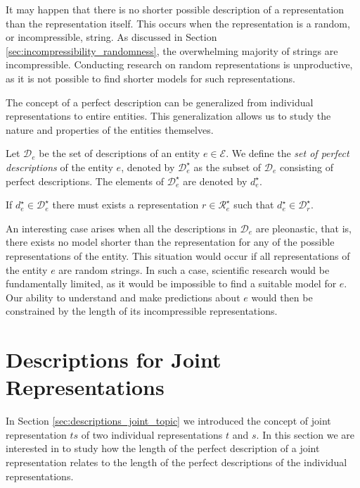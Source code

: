 It may happen that there is no shorter possible description of a representation than the representation itself. This occurs when the representation is a random, or incompressible, string. As discussed in Section \ref{sec:incompressibility_randomness}, the overwhelming majority of strings are incompressible. Conducting research on random representations is unproductive, as it is not possible to find shorter models for such representations.

The concept of a perfect description can be generalized from individual representations to entire entities. This generalization allows us to study the nature and properties of the entities themselves.

\begin{definition}
\label{def:entities_perfect_model}
Let $\mathcal{D}_e$ be the set of descriptions of an entity $e \in \mathcal{E}$. We define the \emph{set of perfect descriptions} of the entity $e$, denoted by $\mathcal{D}^\star_e$ as the subset of $\mathcal{D}_e$ consisting of perfect descriptions. The elements of $\mathcal{D}^\star_e$ are denoted by $d^\star_e$.
\end{definition}

If $d^\star_e \in \mathcal{D}^\star_e$ there must exists a representation $r \in \mathcal{R}^\star_e$ such that $d^\star_e \in \mathcal{D}^\star_r$.

An interesting case arises when all the descriptions in $\mathcal{D}_e$ are pleonastic, that is, there exists no model shorter than the representation for any of the possible representations of the entity. This situation would occur if all representations of the entity $e$ are random strings. In such a case, scientific research would be fundamentally limited, as it would be impossible to find a suitable model for $e$. Our ability to understand and make predictions about $e$ would then be constrained by the length of its incompressible representations.


%
%

\section{Descriptions for Joint Representations}
\label{sec:description_joint_represenation}

In Section \ref{sec:descriptions_joint_topic} we introduced the concept of joint representation $ts$ of two individual representations $t$ and $s$. In this section we are interested in to study how the length of the perfect description of a joint representation relates to the length of the perfect descriptions of the individual representations.

